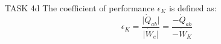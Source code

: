 TASK 4d  
The coefficient of performance \( \epsilon_K \) is defined as:  
\[
\epsilon_K = \frac{\lvert \dot{Q}_{ab} \rvert}{\lvert \dot{W}_e \rvert} = \frac{-\dot{Q}_{ab}}{-\dot{W}_K}
\]  